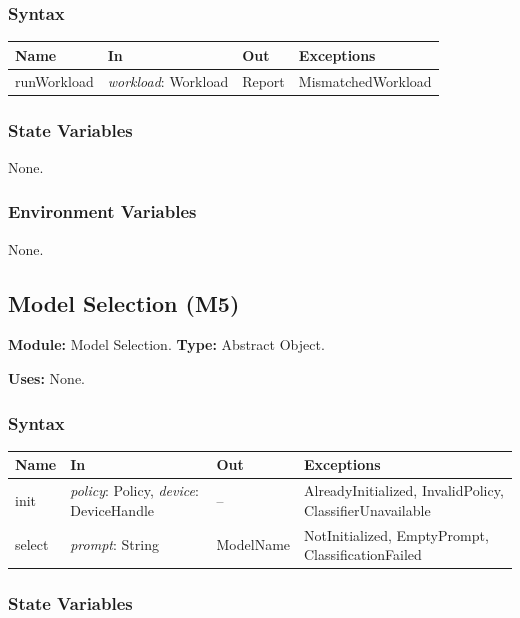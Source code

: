 \documentclass[12pt, titlepage]{article}
\begin{document}
\subsubsection*{Syntax}

\begin{tabularx}{\textwidth}{l X l X}
\toprule
\textbf{Name} & \textbf{In} & \textbf{Out} & \textbf{Exceptions}\\
\midrule
runWorkload & \emph{workload}: Workload & Report & MismatchedWorkload\\
\bottomrule
\end{tabularx}

\subsubsection*{State Variables}

None.

\subsubsection*{Environment Variables}

None.

\newpage
\subsection{Model Selection (M5)}\label{mSelect}

\textbf{Module:} Model Selection. \textbf{Type:} Abstract Object.

\textbf{Uses:} None.

\subsubsection*{Syntax}

\begin{tabularx}{\textwidth}{l X l X}
\toprule
\textbf{Name} & \textbf{In} & \textbf{Out} & \textbf{Exceptions}\\
\midrule
init & \emph{policy}: Policy, \emph{device}: DeviceHandle & -- & AlreadyInitialized, InvalidPolicy, ClassifierUnavailable\\
select & \emph{prompt}: String & ModelName & NotInitialized, EmptyPrompt, ClassificationFailed\\
\bottomrule
\end{tabularx}

\subsubsection*{State Variables}
\end{document}
